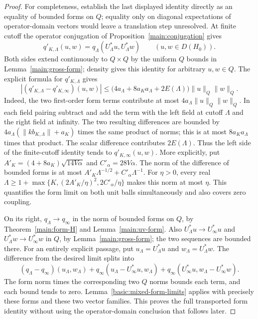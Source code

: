 \documentclass[11pt,a4paper]{article}
\theoremstyle{definition}
\theoremstyle{remark}
\begin{document}
\begin{proof}
For completeness, establish the last displayed identity directly
as an equality of bounded forms on $Q$; equality only on diagonal
expectations of operator-domain vectors would leave a translation
step unresolved. At finite cutoff the operator conjugation of
Proposition~\ref{main:conjugation} gives
\[
 q'_{K,\Lambda}(u,w)
       =q_\Lambda(U_\Lambda^*u,U_\Lambda^*w)
                          \qquad(u,w\in D(H_0)).
\]
Both sides extend continuously to $Q\times Q$ by the uniform
$Q$ bounds in Lemma~\ref{main:gross-form}; density gives this
identity for arbitrary $u,w\in Q$.
The explicit formula for $q'_{K,\Lambda}$ gives
\[
 |(q'_{K,\Lambda}-q'_{K,\infty})(u,w)|
 \leq\bigl(4a_\Lambda+8a_Ka_\Lambda+2E(\Lambda)\bigr)
                         \|u\|_Q\|w\|_Q.
\]
Indeed, the two first-order form terms contribute at most
$4a_\Lambda\|u\|_Q\|w\|_Q$. In each field pairing subtract
and add the term with the left field at cutoff $\Lambda$ and
the right field at infinity. The two resulting differences are
bounded by $4a_\Lambda(\|kb_{K,\Lambda}\|+a_K)$ times the
same product of norms; this is at most $8a_Ka_\Lambda$ times
that product. The scalar difference contributes $2E(\Lambda)$.
Thus the left side of the finite-cutoff identity tends to
$q'_{K,\infty}(u,w)$.
More explicitly, put
$A'_K=(4+8a_K)\sqrt{14V\alpha}$ and $C'_\alpha=28V\alpha$.
The norm of the difference of bounded forms is at most
$A'_K\Lambda^{-1/2}+C'_\alpha\Lambda^{-1}$. For $\eta>0$,
every real
$\Lambda\geq1+\max\{K,(2A'_K/\eta)^2,2C'_\alpha/\eta\}$
makes this norm at most $\eta$. This quantifies the form limit
on both unit balls simultaneously and also covers zero coupling.

On its right, $q_\Lambda\to q_\infty$ in the norm of bounded
forms on $Q$, by Theorem~\ref{main:form-H} and
Lemma~\ref{main:uv-form}. Also $U_\Lambda^*u\to U_\infty^*u$
and $U_\Lambda^*w\to U_\infty^*w$ in $Q$, by
Lemma~\ref{main:gross-form}; the two sequences are bounded there.
For an entirely explicit passage, put $u_\Lambda=U_\Lambda^*u$
and $w_\Lambda=U_\Lambda^*w$. The difference from the desired
limit splits into
\[
 (q_\Lambda-q_\infty)(u_\Lambda,w_\Lambda)
 +q_\infty(u_\Lambda-U_\infty^*u,w_\Lambda)
 +q_\infty(U_\infty^*u,w_\Lambda-U_\infty^*w).
\]
The form norm times the corresponding two $Q$ norms bounds each
term, and each bound tends to zero. Lemma~\ref{basic:mixed-form-limits} applies with precisely these
forms and these two vector families. This proves the full transported
form identity without using the operator-domain conclusion that
follows later.
\end{proof}
\end{document}

